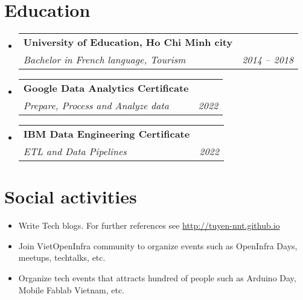 \documentclass[letterpaper,11pt]{article}
\makeatletter
\newcommand{\resumeItemNornal}[1]{
  \item\small{
    {#1 \vspace{-2pt}}
  }
}
\newcommand{\resumeSubheading}[4]{
  \vspace{-1pt}
  \item
    \begin{tabular*}{0.97\textwidth}{l@{\extracolsep{\fill}}r}
      \textbf{#1} & #2 \\
      \textit{\small#3} & \textit{\small #4} \\
    \end{tabular*}\vspace{-5pt}
}
\newcommand{\resumeSubItemNormal}[1]{\resumeItemNornal{#1}\vspace{-4pt}}
\newcommand{\resumeSubHeadingListStart}{\begin{itemize}[leftmargin=*]}
\newcommand{\resumeSubHeadingListEnd}{\end{itemize}}
\makeatother
\begin{document}
\section{Education}
  \resumeSubHeadingListStart
    \resumeSubheading
      {University of Education, Ho Chi Minh city}{}
      {Bachelor in French language, Tourism}{2014 -- 2018}
    \resumeSubheading
      {Google Data Analytics Certificate}{}
      {Prepare, Process and Analyze data}{2022}%
    \resumeSubheading
      {IBM Data Engineering Certificate}{}  
      {ETL and Data Pipelines}{2022}%
  \resumeSubHeadingListEnd




\section{Social activities}
  \resumeSubHeadingListStart
    \resumeSubItemNormal
      {Write Tech blogs. For further references see \url{http://tuyen-nnt.github.io}}
    \resumeSubItemNormal
      {Join VietOpenInfra community to organize events such as OpenInfra Days, meetups, techtalks, etc.}
    \resumeSubItemNormal
      {Organize tech events that attracts hundred of people such as Arduino Day, Mobile Fablab Vietnam, etc.}
\resumeSubHeadingListEnd



\end{document}
